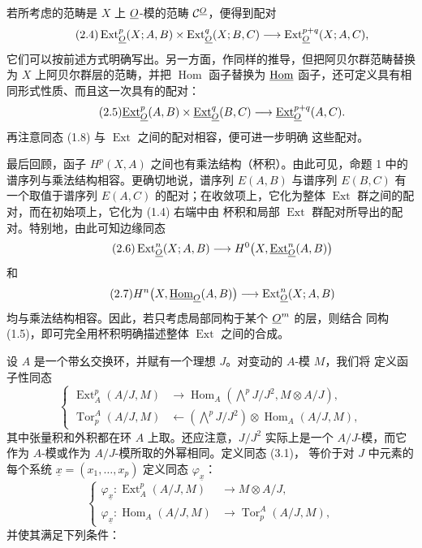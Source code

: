 若所考虑的范畴是 $X$ 上 $\underline{O}$-模的范畴 $\mathcal C^{\underline{O}}$，便得到配对
\begin{equation}\tag{2.4}
  \operatorname{Ext}_{\underline{O}}^{p}(X;A,B)
  \times\operatorname{Ext}_{\underline{O}}^{q}(X;B,C)
  \longrightarrow\operatorname{Ext}_{\underline{O}}^{p+q}(X;A,C),
\end{equation}
它们可以按前述方式明确写出。另一方面，作同样的推导，但把阿贝尔群范畴替换为
$X$ 上阿贝尔群层的范畴，并把 $\operatorname{Hom}$ 函子替换为 $\underline{\operatorname{Hom}}$
函子，还可定义具有相同形式性质、而且这一次具有的配对：
\begin{equation}\tag{2.5}
  \underline{\operatorname{Ext}}_{\underline{O}}^{p}(A,B)\times\underline{\operatorname{Ext}}_{\underline{O}}^{q}(B,C)
  \longrightarrow\underline{\operatorname{Ext}}_{\underline{O}}^{p+q}(A,C).
\end{equation}
再注意同态 (1.8) 与 $\operatorname{Ext}$ 之间的配对相容，便可进一步明确
这些配对。

最后回顾，函子 $H^{p}(X,A)$ 之间也有乘法结构（杯积）。由此可见，命题 1
中的谱序列与乘法结构相容。更确切地说，谱序列 $E(A,B)$ 与谱序列 $E(B,C)$
有一个取值于谱序列 $E(A,C)$ 的配对；在收敛项上，它化为整体
$\operatorname{Ext}$ 群之间的配对，而在初始项上，它化为 (1.4) 右端中由
杯积和局部 $\operatorname{Ext}$ 群配对所导出的配对。特别地，由此可知边缘同态
\begin{equation}\tag{2.6}
  \operatorname{Ext}_{\underline{O}}^{n}(X;A,B)
  \longrightarrow H^{0}\bigl(X,\underline{\operatorname{Ext}}_{\underline{O}}^{n}(A,B)\bigr)
\end{equation}
和
\begin{equation}\tag{2.7}
  H^{n}\bigl(X,\underline{\operatorname{Hom}}_{\underline{O}}(A,B)\bigr)
  \longrightarrow\operatorname{Ext}_{\underline{O}}^{n}(X;A,B)
\end{equation}
均与乘法结构相容。因此，若只考虑局部同构于某个 $\underline{O}^{m}$ 的层，则结合
同构 (1.5)，即可完全用杯积明确描述整体 $\operatorname{Ext}$ 之间的合成。


设 $A$ 是一个带幺交换环，并赋有一个理想 $J$。对变动的 $A$-模 $M$，我们将
定义函子性同态
\begin{equation}\tag{3.1}
\left\{
\begin{aligned}
\operatorname{Ext}_{A}^{p}(A/J,M)
  &\longrightarrow
  \operatorname{Hom}_{A}\!\left(\bigwedge^{p}J/J^{2},M\otimes A/J\right),\\
\operatorname{Tor}_{p}^{A}(A/J,M)
  &\longleftarrow
  \left(\bigwedge^{p}J/J^{2}\right)
  \otimes\operatorname{Hom}_{A}(A/J,M),
\end{aligned}
\right.
\end{equation}
其中张量积和外积都在环 $A$ 上取。还应注意，$J/J^{2}$ 实际上是一个
$A/J$-模，而它作为 $A$-模或作为 $A/J$-模所取的外幂相同。定义同态 (3.1)，
等价于对 $J$ 中元素的每个系统 $\underline{x}=(x_1,\ldots,x_p)$ 定义同态
$\varphi_{\underline{x}}$：
\begin{equation}\tag{3.2}
\left\{
\begin{aligned}
\varphi_{\underline{x}}:
  \operatorname{Ext}_{A}^{p}(A/J,M)&\longrightarrow M\otimes A/J,\\
\varphi_{\underline{x}}:
  \operatorname{Hom}_{A}(A/J,M)&\longrightarrow
  \operatorname{Tor}_{p}^{A}(A/J,M),
\end{aligned}
\right.
\end{equation}
并使其满足下列条件：

